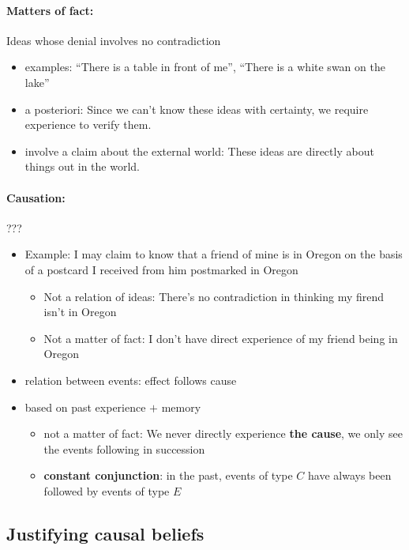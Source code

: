 \documentclass[10pt]{article}
\begin{document}
\paragraph{Matters of fact:} Ideas whose denial involves no contradiction
\begin{itemize}
 \item examples: ``There is a table in front of me'', ``There is a white swan on the lake''
 \item a posteriori: Since we can't know these ideas with certainty, we require experience to verify them.
 \item involve a claim about the external world: These ideas are directly about things out in the world.
\end{itemize}

\paragraph{Causation:} ???
\begin{itemize}
 \item Example: I may claim to know that a friend of mine is in Oregon on the basis of a postcard I received from him postmarked in Oregon
  \begin{itemize}
   \item Not a relation of ideas: There's no contradiction in thinking my firend isn't in Oregon
   \item Not a matter of fact: I don't have direct experience of my friend being in Oregon
  \end{itemize}
 \item relation between events: effect follows cause
 \item based on past experience $+$ memory
 \begin{itemize}
   \item not a matter of fact: We never directly experience \textbf{the cause}, we only see the events following in succession
   \item \textbf{constant conjunction}: in the past, events of type $C$ have always been followed by events of type $E$
  \end{itemize}
\end{itemize}

\newpage

\subsection{Justifying causal beliefs}
\end{document}
